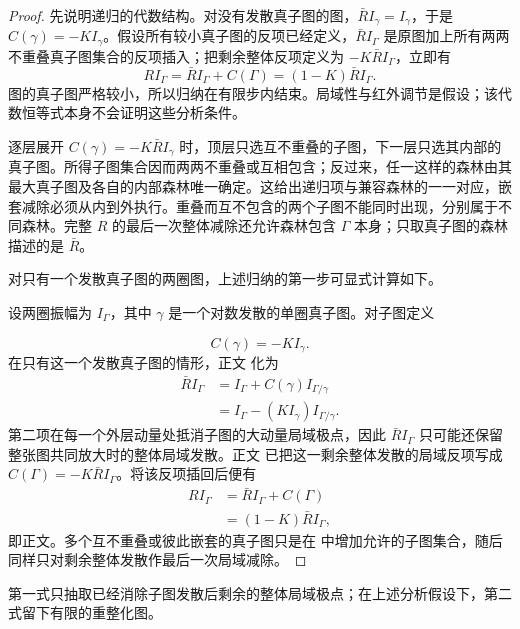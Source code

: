 \begin{proof}
先说明递归的代数结构。对没有发散真子图的图，$\bar RI_\gamma=I_\gamma$，于是 $C(\gamma)=-KI_\gamma$。假设所有较小真子图的反项已经定义，$\bar RI_\Gamma$ 是原图加上所有两两不重叠真子图集合的反项插入；把剩余整体反项定义为 $-K\bar RI_\Gamma$，立即有
\[
RI_\Gamma=\bar RI_\Gamma+C(\Gamma)=(1-K)\bar RI_\Gamma.
\]
图的真子图严格较小，所以归纳在有限步内结束。局域性与红外调节是假设；该代数恒等式本身不会证明这些分析条件。

逐层展开 $C(\gamma)=-K\bar RI_\gamma$ 时，顶层只选互不重叠的子图，下一层只选其内部的真子图。所得子图集合因而两两不重叠或互相包含；反过来，任一这样的森林由其最大真子图及各自的内部森林唯一确定。这给出递归项与兼容森林的一一对应，嵌套减除必须从内到外执行。重叠而互不包含的两个子图不能同时出现，分别属于不同森林。完整 $R$ 的最后一次整体减除还允许森林包含 $\Gamma$ 本身；只取真子图的森林描述的是 $\bar R$。

对只有一个发散真子图的两圈图，上述归纳的第一步可显式计算如下。

设两圈振幅为 $I_\Gamma$，其中 $\gamma$ 是一个对数发散的单圈真子图。对子图定义

\begin{equation*}
 C(\gamma)=-K I_\gamma.
\end{equation*}
在只有这一个发散真子图的情形，正文 化为
\begin{align*}
 \bar R I_\Gamma
 &=I_\Gamma+C(\gamma)I_{\Gamma/\gamma}\\
 &=I_\Gamma-(K I_\gamma)I_{\Gamma/\gamma}.
\end{align*}
第二项在每一个外层动量处抵消子图的大动量局域极点，因此 $\bar R I_\Gamma$ 只可能还保留整张图共同放大时的整体局域发散。正文 已把这一剩余整体发散的局域反项写成 $C(\Gamma)=-K\bar R I_\Gamma$。将该反项插回后便有
\begin{align*}
 R I_\Gamma
 &=\bar R I_\Gamma+C(\Gamma)\\
 &=(1-K)\bar R I_\Gamma,
\end{align*}
即正文。多个互不重叠或彼此嵌套的真子图只是在 中增加允许的子图集合，随后同样只对剩余整体发散作最后一次局域减除。
\end{proof}
第一式只抽取已经消除子图发散后剩余的整体局域极点；在上述分析假设下，第二式留下有限的重整化图。

